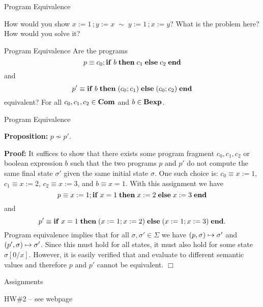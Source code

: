 \documentclass{beamer}
\begin{document}
\begin{frame}{Program Equivalence}

How would you show $x := 1\, ; y:= x \; \sim \; y:=1\, ; x:= y$?  What is the problem here?  
How would you solve it?

\end{frame}


\begin{frame}{Program Equivalence}
Are the programs
\[
p \equiv c_0; {\bf if}\; {b}\;{\bf then}\;{c_1}\;{\bf else}\;{c_2}\;\mbox{\bf end}
\]
and
\[
p' \equiv {\bf if}\; {b}\;{\bf then}\;{(c_0; c_1)}\;{\bf else}\;{(c_0; c_2)}\;\mbox{\bf end}
\]
equivalent?  For all $c_0, c_1, c_2 \in \mbox{\bf Com}$ and $b \in \mbox{\bf Bexp}$.
\end{frame}

\begin{frame}{Program Equivalence}

\small

{\bf Proposition:} $p \not\sim p'$.

{\bf Proof:} It suffices to show that there exists some program fragment $c_0, c_1, c_2$ or
boolean expression $b$ such that the two programs $p$ and $p'$ do not compute the same
final state $\sigma'$ given the same initial state $\sigma$.  One such choice is:
$c_0 \equiv x := 1$, $c_1 \equiv x := 2$,  $c_2 \equiv x := 3$, and $b \equiv x = 1$.
With this assignment we have 
\[
p \equiv x := 1; {\bf if}\; {x = 1}\;{\bf then}\;{x := 2}\;{\bf else}\;{x := 3}\;\mbox{\bf end}
\] 
and
\[
p' \equiv {\bf if}\; {x = 1}\;{\bf then}\;{(x := 1; x:= 2)}\;{\bf else}\;{(x := 1; x := 3)}\;\mbox{\bf end}.
\]
Program equivalence implies that
for all $\sigma, \sigma' \in \Sigma$ we have $( {p}, {\sigma} ) \mapsto {\sigma'}$ and
$( {p'}, {\sigma} ) \mapsto {\sigma'}$.  Since this must hold for all states, it must also hold for
some state $\sigma[0/x]$.  However, it is easily verified that  and 
evaluate to different semantic values and therefore $p$ and $p'$ cannot be equivalent. $\Box$
\end{frame}

\begin{frame}{Assignments}

HW\#2 -- see webpage

\end{frame}
\end{document}
